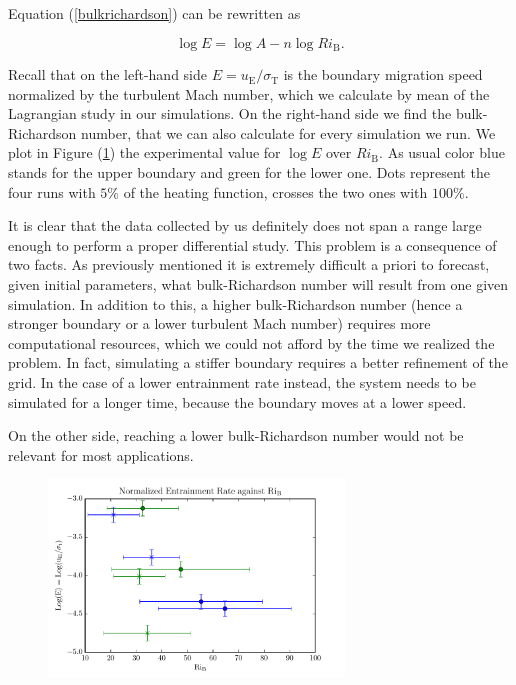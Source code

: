 Equation (\ref{bulkrichardson}) can be rewritten as

\begin{equation}\label{eq:logaritmicbulk}
	\log{E} = \log{A} - n \log{Ri_{\mathrm{B}}}.
\end{equation}

Recall that on the left-hand side $E=u_{\mathrm{E}}/\sigma_{\mathrm{T}}$ is the boundary migration speed normalized by the turbulent Mach number, which we calculate by mean of the Lagrangian study in our simulations. On the right-hand side we find the bulk-Richardson number, that we can also calculate for every simulation we run. We plot in Figure (\ref{fig:differential}) the experimental value for $\log E$ over $Ri_{\mathrm{B}}$. As usual color blue stands for the upper boundary and green for the lower one. Dots represent the four runs with $5 \%$ of the heating function, crosses the two ones with $100 \%$.

It is clear that the data collected by us definitely does not span a range large enough to perform a proper differential study. This problem is a consequence of two facts. As previously mentioned it is extremely difficult a priori to forecast, given initial parameters, what bulk-Richardson number will result from one given simulation. In addition to this, a higher bulk-Richardson number (hence a stronger boundary or a lower turbulent Mach number) requires more computational resources, which we could not afford by the time we realized the problem. In fact, simulating a stiffer boundary requires a better refinement of the grid. In the case of a lower entrainment rate instead, the system needs to be simulated for a longer time, because the boundary moves at a lower speed.

On the other side, reaching a lower bulk-Richardson number would not be relevant for most applications.

\begin{figure}[t!]
\centering
\includegraphics[width=0.7\textwidth]{./img/differential2d.pdf}
\caption{}
\label{fig:differential}
\centering
\end{figure}

